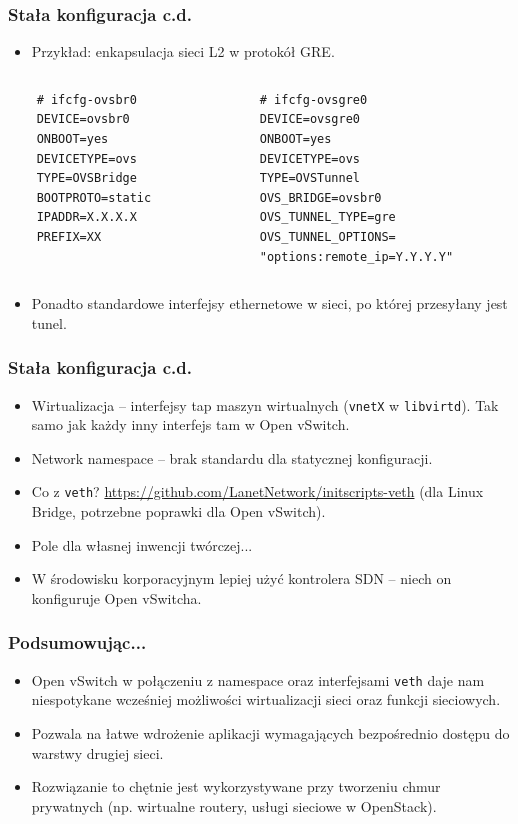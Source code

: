 \documentclass[dvipsnames,table]{beamer}
\begin{document}
\begin{frame}[fragile]
\frametitle{Stała konfiguracja c.d.}
\begin{itemize}
	\item Przykład: enkapsulacja sieci L2 w protokół GRE.
\end{itemize}
\begin{columns}
	\begin{column}{0.5\textwidth}
		\begin{verbatim}
	# ifcfg-ovsbr0
	DEVICE=ovsbr0
	ONBOOT=yes
	DEVICETYPE=ovs
	TYPE=OVSBridge
	BOOTPROTO=static
	IPADDR=X.X.X.X
	PREFIX=XX
		\end{verbatim}
	\end{column}
	\begin{column}{0.5\textwidth}
		\begin{verbatim}
	# ifcfg-ovsgre0
	DEVICE=ovsgre0
	ONBOOT=yes
	DEVICETYPE=ovs
	TYPE=OVSTunnel
	OVS_BRIDGE=ovsbr0
	OVS_TUNNEL_TYPE=gre
	OVS_TUNNEL_OPTIONS=
	"options:remote_ip=Y.Y.Y.Y"
		\end{verbatim}
	\end{column}
\end{columns}
\begin{itemize}
	\item Ponadto standardowe interfejsy ethernetowe w sieci, po której przesyłany jest tunel.
\end{itemize}
\end{frame}

\begin{frame}
\frametitle{Stała konfiguracja c.d.}
\begin{itemize}
	\item Wirtualizacja -- interfejsy tap maszyn wirtualnych ({\tt vnetX} w {\tt libvirtd}). Tak samo jak każdy inny interfejs tam w Open vSwitch.
	\item Network namespace -- brak standardu dla statycznej konfiguracji. 
	\item Co z {\tt veth}? \href{https://github.com/LanetNetwork/initscripts-veth}{https://github.com/LanetNetwork/initscripts-veth} (dla Linux Bridge, potrzebne poprawki dla Open vSwitch).
	\item Pole dla własnej inwencji twórczej...
	\item W środowisku korporacyjnym lepiej użyć kontrolera SDN -- niech on konfiguruje Open vSwitcha.
\end{itemize}
\end{frame}

\begin{frame}
\frametitle{Podsumowując...}
\begin{itemize}
	\item Open vSwitch w połączeniu z namespace oraz interfejsami {\tt veth} daje nam niespotykane wcześniej możliwości wirtualizacji sieci oraz funkcji sieciowych.
	\item Pozwala na łatwe wdrożenie aplikacji wymagających bezpośrednio dostępu do warstwy drugiej sieci.
	\item Rozwiązanie to chętnie jest wykorzystywane przy tworzeniu chmur prywatnych (np. wirtualne routery, usługi sieciowe w OpenStack).
\end{itemize}
\end{frame}
\end{document}
